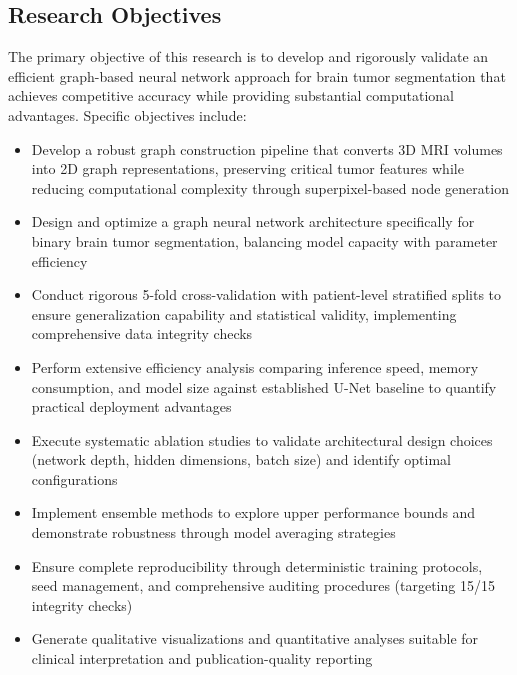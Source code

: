 \subsection{Research Objectives}

The primary objective of this research is to develop and rigorously validate an efficient graph-based neural network approach for brain tumor segmentation that achieves competitive accuracy while providing substantial computational advantages. Specific objectives include:

 \begin{itemize}
    \item Develop a robust graph construction pipeline that converts 3D MRI volumes into 2D graph representations, preserving critical tumor features while reducing computational complexity through superpixel-based node generation
    
    \item Design and optimize a graph neural network architecture specifically for binary brain tumor segmentation, balancing model capacity with parameter efficiency
    
    \item Conduct rigorous 5-fold cross-validation with patient-level stratified splits to ensure generalization capability and statistical validity, implementing comprehensive data integrity checks
    
    \item Perform extensive efficiency analysis comparing inference speed, memory consumption, and model size against established U-Net baseline to quantify practical deployment advantages
    
    \item Execute systematic ablation studies to validate architectural design choices (network depth, hidden dimensions, batch size) and identify optimal configurations
    
    \item Implement ensemble methods to explore upper performance bounds and demonstrate robustness through model averaging strategies
    
    \item Ensure complete reproducibility through deterministic training protocols, seed management, and comprehensive auditing procedures (targeting 15/15 integrity checks)
    
    \item Generate qualitative visualizations and quantitative analyses suitable for clinical interpretation and publication-quality reporting
 \end{itemize}

